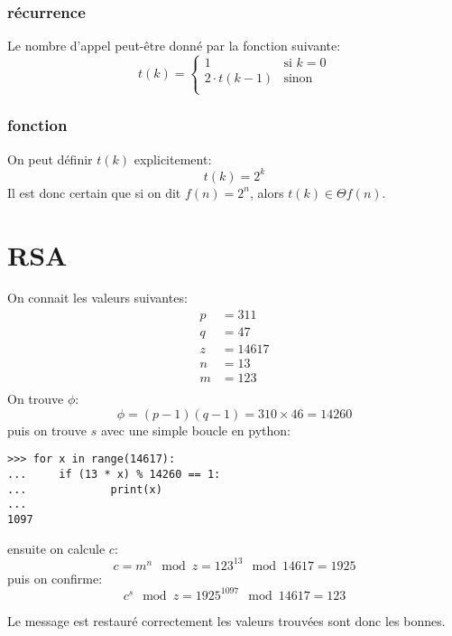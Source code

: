 \documentclass{article}
\begin{document}
\subsubsection{récurrence}
Le nombre d'appel peut-être donné par la fonction suivante:
\begin{equation}
  t(k)=
  \begin{cases}
    1 \hspace{1cm} & \text{si } k = 0\\
    2 \cdot t(k - 1) & \text{sinon}\\
  \end{cases}
\end{equation}
\subsubsection{fonction}
On peut définir $t(k)$ explicitement:
\begin{equation}
  t(k) = 2^k
\end{equation}
Il est donc certain que si on dit $f(n)=2^n$, alors $t(k) \in \Theta f(n)$.

\section{RSA}
On connait les valeurs suivantes:
\begin{align*}
  p &= 311\\
  q &= 47\\
  z &= 14617\\
  n &= 13\\
  m &= 123\\
\end{align*}
On trouve $\phi$:
$$ \phi = (p - 1)(q - 1) = 310 \times 46 = 14260 $$
puis on trouve $s$ avec une simple boucle en python:
\begin{lstlisting}
>>> for x in range(14617):
...     if (13 * x) % 14260 == 1:
...             print(x)
... 
1097
\end{lstlisting}
ensuite on calcule $c$:
$$ c = m^n \mod z = 123^{13} \mod 14617 = 1925 $$
puis on confirme:
$$ c^s \mod z = 1925^{1097} \mod 14617 = 123 $$

Le message est restauré correctement les valeurs trouvées sont donc les bonnes.

\pagebreak
\end{document}
